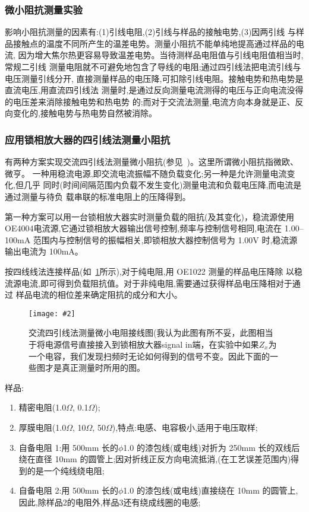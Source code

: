\documentclass[11pt,a4paper]{ctexart}
\newcommand{\cpic}[2]{
\begin{center}
\texttt{[image: \#2]}
\end{center}
}
\newcommand{\cpicn}[3]
{
\begin{figure}[H]
\cpic{#1}{#2}
\caption{\color{red}#3\label{#2}}
\end{figure}
}
\begin{document}
\subsubsection{微小阻抗测量实验}
影响小阻抗测量的因素有:(1)引线电阻,(2)引线与样品的接触电势,(3)因两引线
与样品接触点的温度不同所产生的温差电势。测量小阻抗不能单纯地提高通过样品的电流,
因为增大焦尔热更容易导致温差电势。当待测样品电阻值与引线电阻值相当时,常规二引线
测量电阻就不可避免地包含了导线的电阻;通过四引线法把电流引线与电压测量引线分开,
直接测量样品的电压降,可扣除引线电阻。接触电势和热电势是直流电压,用直流四引线法
测量时,是通过反向测量电流测得的电压与正向电流没得的电压差来消除接触电势和热电势
的;而对于交流法测量,电流方向本身就是正、反向变化的,接触电势与热电势自然被消除。
\subsubsection{应用锁相放大器的四引线法测量小阻抗}
有两种方案实现交流四引线法测量微小阻抗(参见~\cite{lec})。这里所谓微小阻抗指微欧、微亨。
一种用稳流电源,即交流电流振幅不随负载变化;另一种是允许测量电流变化,但几乎
同时(时间间隔范围内负载不发生变化)测量电流和负载电压降,而电流是通过测量与待负
载串联的标准电阻上的压降得到。

第一种方案可以用一台锁相放大器实时测量负载的阻抗(及其变化)，稳流源使用OE4004电流源,它通过锁相放大器输出信号控制,频率与控制信号相同,电流在 1.00--100mA 范围内与控制信号的振幅相关,即锁相放大器控制信号为 1.00V 时,稳流源输出电流为 100mA。

按四线线法连接样品(如~\cref{tiny_resis}所示),对于纯电阻,用 OE1022 测量的样品电压降除
以稳流源电流,即可得到负载阻抗值。对于非纯电阻,需要通过获得样品电压降相对于通过
样品电流的相位差来确定阻抗的成分和大小。
\cpicn{0.5}{tiny_resis}{交流四引线法测量微小电阻接线图(我认为此图有所不妥，此图相当于将电源信号直接接入到锁相放大器signal in端，在实验中如果$Z_x$为一个电容，我们发现扫频时无论如何得到的信号不变。因此下面的一些图才是真正测量时所用的图。}

样品:
\begin{enumerate}
\item 精密电阻(1.0$\Omega$, 0.1$\Omega$);
\item  厚膜电阻(1.0$\Omega$, 10$\Omega$, 50$\Omega$),特点:电感、电容极小,适用于电压取样;
 \item 自备电阻 1:用 500mm 长的$\phi$1.0 的漆包线(或电线)对折为 250mm 长的双线后绕在直径 10mm 的圆管上;因对折线正反方向电流抵消,(在工艺误差范围内)得到的是一个纯线绕电阻;
 \item 自备电阻 2:用 500mm 长的$\phi$1.0 的漆包线(或电线)直接绕在 10mm 的圆管上,因此,除样品2的电阻外,样品3还有绕成线圈的电感;
\end{enumerate}
\end{document}
